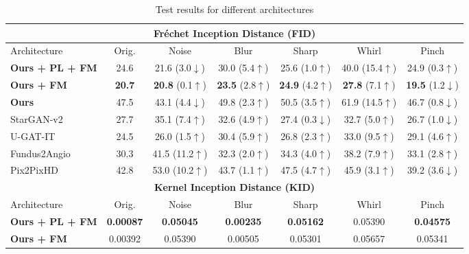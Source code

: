 \documentclass[a4paper,conference]{IEEEtran}
\begin{document}
\begin{table*}[ht]
\centering

\caption{Test results for different architectures}
\begin{adjustbox}{width=5.8in,totalheight=2.8in}
\begin{threeparttable}
    \begin{tabular}{|l|c|c|c|c|c|c|} 
    \hline
    \multicolumn{7}{|c|}{\textbf{Fréchet Inception Distance (FID)}}\\
    \hline
    Architecture &  Orig. &  Noise & Blur &  Sharp & Whirl & Pinch \\
    \hline
    \textbf{Ours + PL\tnote{1} + FM\tnote{2}} & 24.6 &  21.6 (3.0$\downarrow$) &  30.0 (5.4$\uparrow$) &  25.6 (1.0$\uparrow$) &  40.0 (15.4$\uparrow$) &  24.9 (0.3$\uparrow$) \\
    \textbf{Ours + FM\tnote{2}} & \textbf{20.7} &  \textbf{20.8 }(0.1$\uparrow$) &  \textbf{23.5} (2.8$\uparrow$) &  \textbf{24.9} (4.2$\uparrow$) & \textbf{27.8} (7.1$\uparrow$) &  \textbf{19.5} (1.2$\downarrow$) \\
    \textbf{Ours} & 47.5 &  43.1 (4.4$\downarrow$) &  49.8 (2.3$\uparrow$) &  50.5 (3.5$\uparrow$) &  61.9 (14.5$\uparrow$) &  46.7 (0.8$\downarrow$) \\ 
    StarGAN-v2 \cite{choi2020stargan} & 27.7 & 35.1 (7.4$\uparrow$) & 32.6 (4.9$\uparrow$) & 27.4 (0.3$\downarrow$) & 32.7 (5.0$\uparrow$) & 26.7 (1.0$\downarrow$) \\
    U-GAT-IT \cite{kim2019u} & 24.5 & 26.0 (1.5$\uparrow$) & 30.4 (5.9$\uparrow$)  & 26.8 (2.3$\uparrow$) & 33.0 (9.5$\uparrow$) & 29.1 (4.6$\uparrow$) \\
    Fundus2Angio \cite{kamran2020fundus2angio} & 30.3 &  41.5 (11.2$\uparrow$) & 32.3 (2.0$\uparrow$) & 34.3 (4.0$\uparrow$) & 38.2 (7.9$\uparrow$) & 33.1 (2.8$\uparrow$) \\ 
    Pix2PixHD \cite{wang2018high} & 42.8  & 53.0 (10.2$\uparrow$)& 43.7 (1.1$\uparrow$) & 47.5 (4.7$\uparrow$) & 45.9 (3.1$\uparrow$) & 39.2 (3.6$\downarrow$) \\ 
    \hline
    \hline
    \multicolumn{7}{|c|}{\textbf{Kernel Inception Distance (KID)}}\\
    \hline
    Architecture &  Orig. &  Noise & Blur &  Sharp & Whirl & Pinch \\
    \hline
    \textbf{Ours + PL\tnote{1} + FM\tnote{2}} & \textbf{0.00087} & \textbf{0.05045} & \textbf{0.00235} & \textbf{0.05162} & 0.05390 & \textbf{0.04575} \\
    \textbf{Ours + FM\tnote{2}} & 0.00392 &	0.05390 & 0.00505 & 0.05301 & 0.05657	& 0.05341 \\

\end{tabular}
\end{threeparttable}
\end{adjustbox}
\end{table*}
\end{document}

